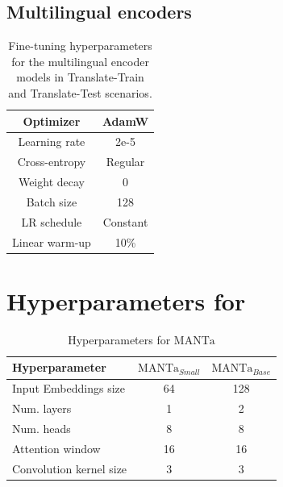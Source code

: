 \begin{appendices}
\subsection{Multilingual encoders}
\label{app:ft_multi_enc}
\begin{table}[H]
\centering \small
\begin{tabular}{c|c}
\toprule
Optimizer        &   AdamW         \\ \hline
Learning rate        &   2e-5         \\ \hline
Cross-entropy  &  Regular    \\ \hline
Weight decay  &     0      \\ \hline
Batch size & 128 \\ \hline
LR schedule & Constant \\ \hline
Linear warm-up & 10\% \\ \bottomrule
\end{tabular}
\caption{Fine-tuning hyperparameters for the multilingual encoder models in Translate-Train and Translate-Test scenarios.}
\label{tab:ft_multi_enc}
\end{table}

\section{Hyperparameters for }
\label{sec:appendix_hp}
\begin{table}[H]
\centering\small
\begin{tabular}{lcc}
\toprule
Hyperparameter                                   & $\text{MANTa}_{Small}$  & $\text{MANTa}_{Base}$ \\ \midrule
Input Embeddings size          & 64 & 128         \\
Num. layers  & 1 & 2        \\
Num. heads  & 8 & 8        \\
Attention window & 16 & 16        \\
Convolution kernel size & 3 & 3        \\ \bottomrule
\end{tabular}
\caption{Hyperparameters for $\text{MANTa}$}
\label{tab:hp_fp}
\end{table}


\end{appendices}
